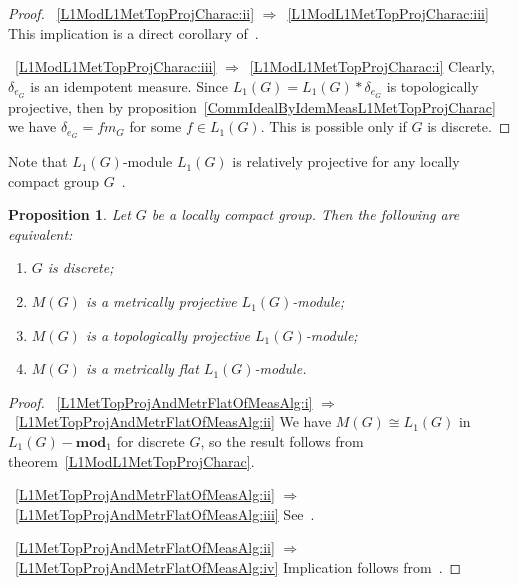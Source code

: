 \documentclass{article}
\theoremstyle{plain}
\newtheorem{proposition}{Proposition}[section]
\theoremstyle{definition}
\newtheorem{proof}{Proof}\def\theproof{}
\newcommand{\convol}{\ast}
\newcommand{\isom}{\mathop{\mathbin{\cong}}}
\begin{document}
\begin{fulltext}
\begin{proof}
~\ref{L1ModL1MetTopProjCharac:ii}
$\Longrightarrow$~\ref{L1ModL1MetTopProjCharac:iii} This implication is a
direct corollary of~\cite[proposition 2.4]{NemGeomProjInjFlatBanMod}.

~\ref{L1ModL1MetTopProjCharac:iii}
$\Longrightarrow$~\ref{L1ModL1MetTopProjCharac:i} Clearly, $\delta_{e_G}$ is an
idempotent measure. Since $L_1(G)=L_1(G)\convol \delta_{e_G}$ is topologically
projective, then by proposition~\ref{CommIdealByIdemMeasL1MetTopProjCharac} we
have $\delta_{e_G}=f m_G$ for some $f\in L_1(G)$. This is possible only if $G$
is discrete.
\end{proof}

Note that $L_1(G)$-module $L_1(G)$ is relatively projective for any locally
compact group $G$~\cite[exercise 7.1.17]{HelBanLocConvAlg}.

\begin{proposition}\label{L1MetTopProjAndMetrFlatOfMeasAlg} Let $G$ be a locally
compact group. Then the following are equivalent:
\begin{enumerate}[label = (\roman*)]
    \item $G$ is discrete;\label{L1MetTopProjAndMetrFlatOfMeasAlg:i}
    \item $M(G)$ is a metrically projective 
    $L_1(G)$-module;\label{L1MetTopProjAndMetrFlatOfMeasAlg:ii}
 
    \item $M(G)$ is a topologically projective 
    $L_1(G)$-module;\label{L1MetTopProjAndMetrFlatOfMeasAlg:iii}
    
    \item $M(G)$ is a metrically flat 
    $L_1(G)$-module.\label{L1MetTopProjAndMetrFlatOfMeasAlg:iv}
\end{enumerate}
\end{proposition}
\begin{proof} 
~\ref{L1MetTopProjAndMetrFlatOfMeasAlg:i}
$\Longrightarrow$~\ref{L1MetTopProjAndMetrFlatOfMeasAlg:ii} We have $M(G)\isom
L_1(G)$ in $L_1(G)-\mathbf{mod}_1$ for discrete $G$, so the result follows from
theorem~\ref{L1ModL1MetTopProjCharac}. 

~\ref{L1MetTopProjAndMetrFlatOfMeasAlg:ii}
$\Longrightarrow$~\ref{L1MetTopProjAndMetrFlatOfMeasAlg:iii}
See~\cite[proposition 2.4]{NemGeomProjInjFlatBanMod}.

~\ref{L1MetTopProjAndMetrFlatOfMeasAlg:ii}
$\Longrightarrow$~\ref{L1MetTopProjAndMetrFlatOfMeasAlg:iv} Implication follows
from~\cite[proposition 2.26]{NemGeomProjInjFlatBanMod}.


\end{proof}
\end{fulltext}
\end{document}
